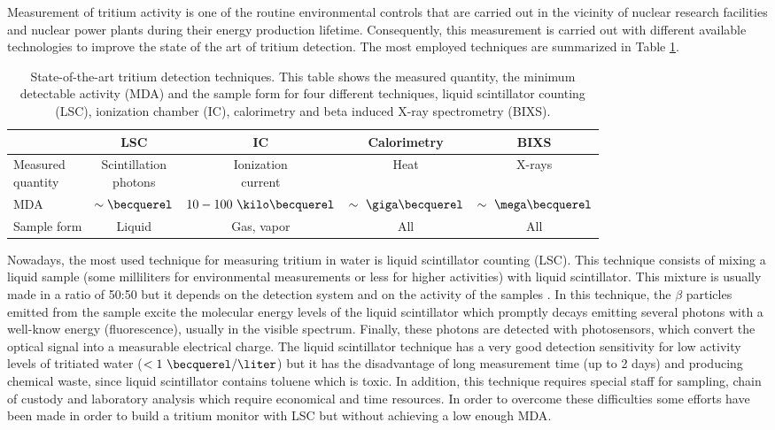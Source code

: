 Measurement of tritium activity is one of the routine environmental controls that are carried out in the vicinity of nuclear research facilities and nuclear power plants during their energy production lifetime. Consequently, this measurement is carried out with different available technologies to improve the state of the art of tritium detection. The most employed techniques are summarized in Table \ref{tab:DifferentThecnics}.

\begin{table}[htbp]
\centering{}%
\begin{tabular}{lcccc}
\toprule 
 & LSC & IC & Calorimetry & BIXS \tabularnewline
\midrule
\midrule 
\parbox{5em}{Measured\\ quantity} & \parbox{5em}{\centering Scintillation\\ photons} &  \parbox{5em}{\centering Ionization\\ current} & Heat & X-rays \tabularnewline
MDA & $\sim\becquerel$ & $10-100~\kilo\becquerel$ & $\sim~\giga\becquerel$ & $\sim~\mega\becquerel$ \tabularnewline
Sample form & Liquid & Gas, vapor & All & All \tabularnewline
\bottomrule
\end{tabular}
\caption{State-of-the-art tritium detection techniques. This table shows the measured quantity, the minimum detectable activity (MDA) and the sample form for four different techniques, liquid scintillator counting (LSC), ionization chamber (IC), calorimetry and beta induced X-ray spectrometry (BIXS).}
\label{tab:DifferentThecnics}
\end{table}

Nowadays, the most used technique for measuring tritium in water is liquid scintillator counting (LSC). This technique consists of mixing a liquid sample (some milliliters for environmental measurements or less for higher activities) with liquid scintillator. This mixture is usually made in a ratio of 50:50 but it depends on the detection system and on the activity of the samples \cite{LSCothers, HofstetterSeveral}. In this technique, the $\beta$ particles emitted from the sample excite the molecular energy levels of the liquid scintillator which promptly decays emitting several photons with a well-know energy (fluorescence), usually in the visible spectrum. Finally, these photons are detected with photosensors, which convert the optical signal into a measurable electrical charge. The liquid scintillator technique has a very good detection sensitivity for low activity levels of tritiated water ($<1~\becquerel/\liter$) \cite{0.6Bq_L} but it has the disadvantage of long measurement time (up to 2 days) and producing chemical waste, since liquid scintillator contains toluene which is toxic. In addition, this technique requires special staff for sampling, chain of custody and laboratory analysis which require economical and time resources. In order to overcome these difficulties some efforts have been made in order to build a tritium monitor with LSC but without achieving a low enough MDA\cite{OnlineLSC}. 

